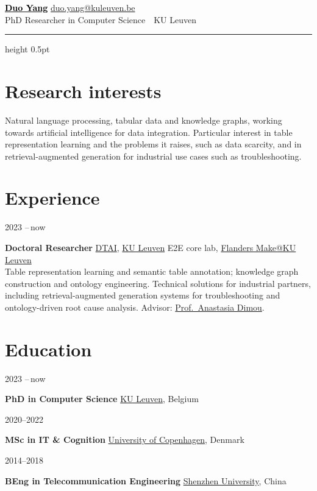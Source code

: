 \documentclass[11pt,a4paper]{article}
\newcommand{\cvdot}{\,\textperiodcentered\,}
\newlength{\raillen}\setlength{\raillen}{30mm}
\newcommand{\cvrow}[2]{%
  \noindent\parbox[t]{\raillen}{\small #1}%
  \parbox[t]{\dimexpr\linewidth-\raillen\relax}{#2}\par\vspace{3pt}}
\newcommand{\cvrowsub}[3]{%
  \noindent\parbox[t]{\raillen}{\small #1}%
  \parbox[t]{\dimexpr\linewidth-\raillen\relax}{#2\\[1pt]{\small #3}}\par\vspace{5pt}}
\begin{document}
\thispagestyle{first}

{\LARGE\bfseries\href{https://duo0301.github.io}{\textcolor{black}{Duo Yang}}}\quad
{\small\href{mailto:duo.yang@kuleuven.be}{duo.yang@kuleuven.be}}\hfill
{\small
\href{https://duo0301.github.io}{\faGlobe} \cvdot{}
\href{https://orcid.org/0009-0008-5942-3397}{\aiOrcid} \cvdot{}
\href{https://scholar.google.com/citations?user=apSK8IcAAAAJ}{\aiGoogleScholar} \cvdot{}
\href{https://github.com/duo0301}{\faGithub} \cvdot{}
\href{https://www.linkedin.com/in/duo-yang-614526231}{\faLinkedin}}\\[3pt]
{\normalsize PhD Researcher in Computer Science \cvdot{} KU Leuven}
\vspace{4pt}\hrule height 0.5pt
\vspace{2pt}

\section*{Research interests}
Natural language processing, tabular data and knowledge graphs, working towards
artificial intelligence for data integration. Particular interest in table
representation learning and the problems it raises, such as data scarcity, and in
retrieval-augmented generation for industrial use cases such as troubleshooting.

\section*{Experience}
\cvrowsub{2023 --\,now}{\textbf{Doctoral Researcher}\cvdot{}\href{https://dtai.cs.kuleuven.be/}{DTAI},
  \href{https://www.kuleuven.be/kuleuven}{KU Leuven}\cvdot{}E2E core lab,
  \href{https://www.kuleuven.be/flandersmake}{Flanders Make@KU Leuven}}
  {Table representation learning and semantic table annotation; knowledge graph
   construction and ontology engineering. Technical solutions for industrial partners,
   including retrieval-augmented generation systems for troubleshooting and
   ontology-driven root cause analysis. Advisor:
   \href{https://www.kuleuven.be/wieiswie/en/person/00142590}{Prof.\ Anastasia Dimou}.}

\section*{Education}
\cvrow{2023 --\,now}{\textbf{PhD in Computer Science}\cvdot{}\href{https://www.kuleuven.be/kuleuven}{KU Leuven}, Belgium}
\cvrow{2020--2022}{\textbf{MSc in IT \& Cognition}\cvdot{}\href{https://www.ku.dk/}{University of Copenhagen}, Denmark}
\cvrow{2014--2018}{\textbf{BEng in Telecommunication Engineering}\cvdot{}\href{https://en.szu.edu.cn/}{Shenzhen University}, China}
\end{document}
